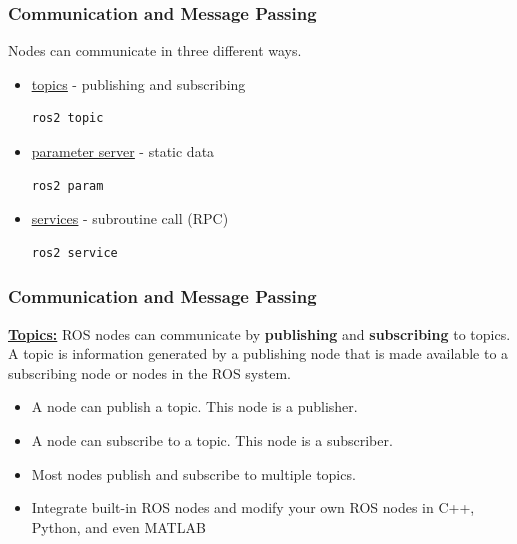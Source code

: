 \documentclass[fleqn]{beamer} %
\newcommand{\sectiontitleII}{Communication and Message Passing}
\begin{document}
	\begin{frame}[label=sectionII,containsverbatim] \small
		\frametitle{\sectiontitleII}
		
                  {\large  Nodes can communicate in three different ways. }
                        \begin{itemize}
                            \item \href{http://wiki.ros.org/Topics}{\underline{topics}} - publishing and subscribing 
                            \begin{lstlisting}
ros2 topic                             
                            \end{lstlisting}
                            \item \href{http://wiki.ros.org/Parameter\%20Serverparameters}{\underline{parameter server}} - static data 
                            \begin{lstlisting}
ros2 param                        
                            \end{lstlisting}
                            \item \href{http://wiki.ros.org/Services}{\underline{services}} - subroutine call (RPC) 
                            \begin{lstlisting}
ros2 service                      
                            \end{lstlisting}
                        \end{itemize}    


	\end{frame}

	\begin{frame}[containsverbatim] \small
		\frametitle{\sectiontitleII}

\href{http://wiki.ros.org/Topics}{\bf Topics:} ROS nodes can communicate by {\bf publishing} and {\bf subscribing} to topics. A topic is information generated by a publishing node that is made available to a subscribing node or nodes in the ROS system.
        
        \begin{itemize}		
            \item A node can publish a topic. This node is a publisher.    	
            \item A node can subscribe to a topic. This node is a subscriber.
            \item Most nodes publish and subscribe to multiple topics. 
            \item Integrate built-in ROS nodes and modify your own ROS nodes in C++, Python, and even MATLAB
            
        \end{itemize}
        
	\end{frame}
\end{document}
